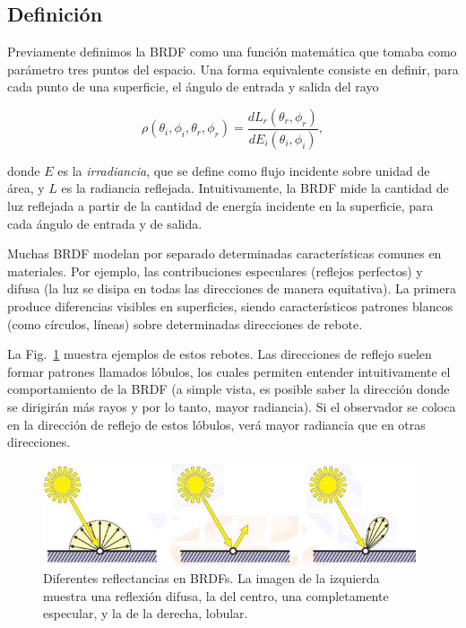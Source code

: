 \subsection{Definición}
Previamente definimos la BRDF como una función matemática que tomaba como parámetro tres puntos del espacio.
Una forma equivalente consiste en definir, para cada punto de una superficie, el ángulo de entrada y salida del rayo

$$\rho(\theta_{i},\phi_{i},\theta_{r},\phi_{r}) = \frac{dL_{r}(\theta_{r},\phi_{r})}{dE_{i}(\theta_{i},\phi_{i})},$$

donde $E$ es la {\em irradiancia}, que se define como flujo incidente sobre unidad de área, y $L$ es la radiancia reflejada.
Intuitivamente, la BRDF mide la cantidad de luz reflejada a partir de la cantidad de energía incidente en la superficie, para cada ángulo de entrada y de salida.

Muchas BRDF modelan por separado determinadas características comunes en materiales.
Por ejemplo, las contribuciones especulares (reflejos perfectos) y difusa (la luz se disipa en todas las direcciones de manera equitativa).
La primera produce diferencias visibles en superficies, siendo característicos patrones blancos (como círculos, líneas) sobre determinadas direcciones de rebote.

La Fig.~\ref{fg:contribuciones} muestra ejemplos de estos rebotes.
Las direcciones de reflejo suelen formar patrones llamados lóbulos, los cuales permiten entender intuitivamente el comportamiento de la BRDF (a simple vista, es posible saber la dirección donde se dirigirán más rayos y por lo tanto, mayor radiancia).
Si el observador se coloca en la dirección de reflejo de estos lóbulos, verá mayor radiancia que en otras direcciones.

\begin{figure}
\center
\includegraphics[width=11cm]{figures/contribuciones}
\caption[Diferentes reflectancias en BRDFs]{Diferentes reflectancias en BRDFs. La imagen de la izquierda muestra una reflexión difusa, la del centro, una completamente especular, y la de la derecha, lobular.}
\label{fg:contribuciones}
\end{figure}

